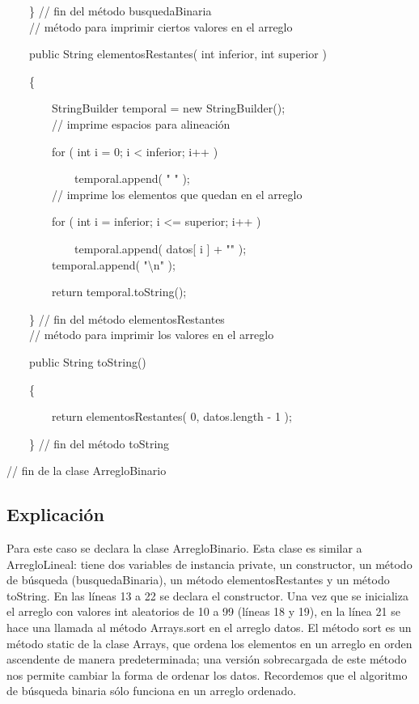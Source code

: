 {\noindent \ \ \ \ \} // fin del método busquedaBinaria\\

\noindent \ \ \ \ // método para imprimir ciertos valores en el arreglo

\noindent \ \ \ \ public String elementosRestantes( int inferior, int superior )

\noindent \ \ \ \ \{

\noindent \ \ \ \ \ \ \ \ StringBuilder temporal = new StringBuilder();\\

\noindent \ \ \ \ \ \ \ \ // imprime espacios para alineación

\noindent \ \ \ \ \ \ \ \ for ( int i = 0; i < inferior; i++ )

\noindent \ \ \ \ \ \ \ \ \ \ \ \ temporal.append( "  " );\\

\noindent \ \ \ \ \ \ \ \ // imprime los elementos que quedan en el arreglo

\noindent \ \ \ \ \ \ \ \ for ( int i = inferior; i <= superior; i++ )

\noindent \ \ \ \ \ \ \ \ \ \ \ \ temporal.append( datos[ i ] + "" );\\

\noindent \ \ \ \ \ \ \ \ temporal.append( "\textbackslash n" );
 
\noindent \ \ \ \ \ \ \ \ return temporal.toString();

\noindent \ \ \ \ \} // fin del método elementosRestantes\\

\noindent \ \ \ \ // método para imprimir los valores en el arreglo

\noindent \ \ \ \ public String toString()

\noindent \ \ \ \ \{

\noindent \ \ \ \ \ \ \ \ return elementosRestantes( 0, datos.length - 1 );

\noindent \ \ \ \ \} // fin del método toString 

// fin de la clase ArregloBinario


}

\subsection{Explicación}

Para este caso se declara la clase ArregloBinario. Esta clase es similar a ArregloLineal: tiene dos variables de instancia private, un constructor, un método de búsqueda (busquedaBinaria), un método elementosRestantes y un método toString. En las líneas 13 a 22 se declara el constructor. Una vez que se inicializa el arreglo con valores int aleatorios de 10 a 99 (líneas 18 y 19), en la línea 21 se hace una llamada al método Arrays.sort en el arreglo datos. El método sort es un método static de la clase Arrays, que ordena los elementos en un arreglo en orden ascendente de manera predeterminada; una versión sobrecargada de este método nos permite cambiar la forma de ordenar los datos. Recordemos que el algoritmo de búsqueda binaria sólo funciona en un arreglo ordenado.

